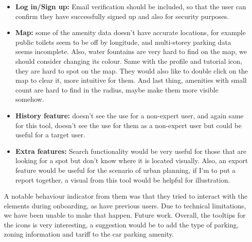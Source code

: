 \begin{itemize}
    \item \textbf{Log in/Sign up: }Email verification should be included, so
          that the user can confirm they have successfully signed up and also for
          security purposes.
          \vspace{0.2cm}
          
    \item \textbf{Map: }some of the amenity data doesn't have accurate
          locations, for example public toilets seem to be off by longitude, and
          multi-storey parking data seems incomplete. Also, water fountains are very
          hard to find on the map, we should consider changing its colour. Same with
          the profile and tutorial icon, they are hard to spot on the map. They would
          also like to double click on the map to clear it, more intuitive for them.
          And last thing, amenities with small count are hard to find in the radius,
          maybe make them more visible somehow.
          \vspace{0.2cm}
          
    \item \textbf{History feature: }doesn't see the use for a non-expert user,
          and again same for this tool, doesn't see the use for them as a non-expert
          user but could be useful for a target user.
          \vspace{0.2cm}
          
    \item \textbf{Extra features: }Search functionality would be very useful for
          those that are looking for a spot but don't know where it is located
          visually. Also, an export feature would be useful for the scenario of urban
          planning, if I'm to put a report together, a visual from this tool would be
          helpful for illustration.
\end{itemize}

A notable behaviour indicator from them was that they tried to interact with the
elements during onboarding, as have previous users. Due to technical
limitations, we have been unable to make that happen. Future work.
Overall, the tooltips for the icons is very interesting, a suggestion would be
to add the type of parking, zoning information and tariff to the car parking
amenity.

